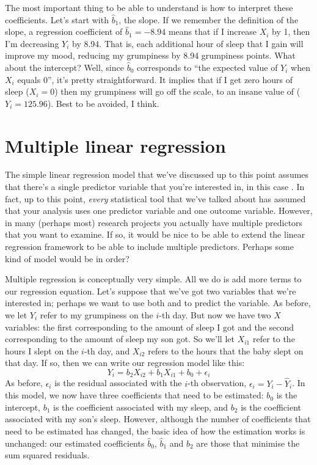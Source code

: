 
The most important thing to be able to understand is how to interpret these coefficients. Let's start with $\hat{b}_1$, the slope. If we remember the definition of the slope, a regression coefficient of $\hat{b}_1 = -8.94$ means that if I increase $X_i$ by 1, then I'm decreasing $Y_i$ by 8.94. That is, each additional hour of sleep that I gain will improve my mood, reducing my grumpiness by 8.94 grumpiness points. What about the intercept? Well, since $\hat{b}_0$ corresponds to ``the expected value of $Y_i$ when $X_i$ equals 0'', it's pretty straightforward. It implies that if I get zero hours of sleep ($X_i =0$) then my grumpiness will go off the scale, to an insane value of ($Y_i = 125.96$). Best to be avoided, I think.



\section{Multiple linear regression~\label{sec:multipleregression}}

The simple linear regression model that we've discussed up to this point assumes that there's a single predictor variable that you're interested in, in this case . In fact, up to this point, {\it every} statistical tool that we've talked about has assumed that your analysis uses one predictor variable and one outcome variable. However, in many (perhaps most) research projects you actually have multiple predictors that you want to examine. If so, it would be nice to be able to extend the linear regression framework to be able to include multiple predictors. Perhaps some kind of  model would be in order?

Multiple regression is conceptually very simple. All we do is add more terms to our regression equation. Let's suppose that we've got two variables that we're interested in; perhaps we want to use both  and  to predict the  variable. As before, we let $Y_i$ refer to my grumpiness on the $i$-th day. But now we have two $X$ variables: the first corresponding to the amount of sleep I got and the second corresponding to the amount of sleep my son got. So we'll let $X_{i1}$ refer to the hours I slept on the $i$-th day, and $X_{i2}$ refers to the hours that the baby slept on that day. If so, then we can write our regression model like this:
$$
Y_i = b_2 X_{i2} + b_1 X_{i1} + b_0 + \epsilon_i
$$
As before, $\epsilon_i$ is the residual associated with the $i$-th observation, $\epsilon_i = {Y}_i - \hat{Y}_i$. In this model, we now have three coefficients that need to be estimated: $b_0$ is the intercept, $b_1$ is the coefficient associated with my sleep, and $b_2$ is the coefficient associated with my son's sleep. However, although the number of coefficients that need to be estimated has changed, the basic idea of how the estimation works is unchanged: our estimated coefficients $\hat{b}_0$, $\hat{b}_1$ and $\hat{b}_2$ are those that minimise the sum squared residuals. 

